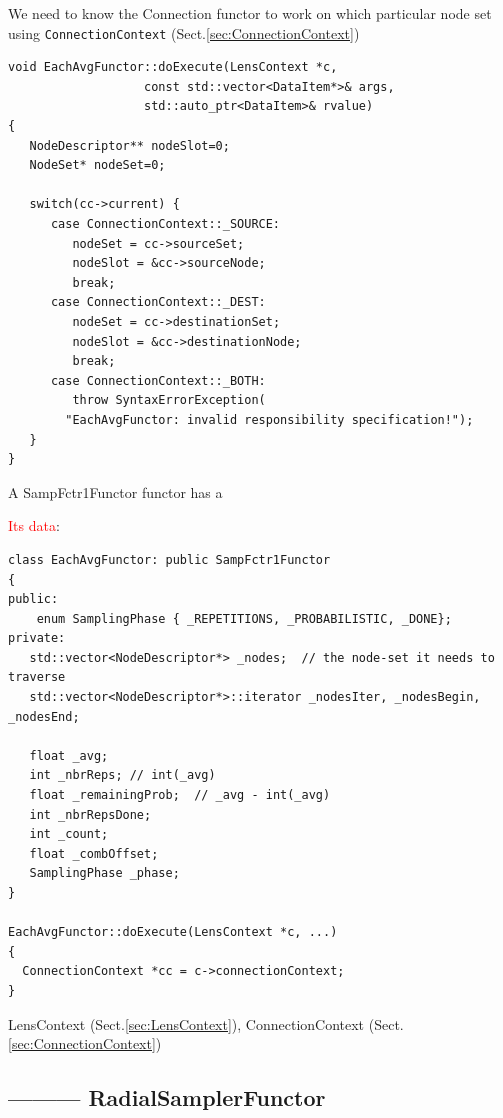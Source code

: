 We need to know the  Connection functor to work on which particular node set
using \verb!ConnectionContext! (Sect.\ref{sec:ConnectionContext})


{\tiny
\begin{lstlisting}
void EachAvgFunctor::doExecute(LensContext *c, 
			       const std::vector<DataItem*>& args, 
			       std::auto_ptr<DataItem>& rvalue)
{
   NodeDescriptor** nodeSlot=0;
   NodeSet* nodeSet=0;

   switch(cc->current) {
      case ConnectionContext::_SOURCE:
         nodeSet = cc->sourceSet;
         nodeSlot = &cc->sourceNode;
         break;
      case ConnectionContext::_DEST:
         nodeSet = cc->destinationSet;
         nodeSlot = &cc->destinationNode;
         break;
      case ConnectionContext::_BOTH:
         throw SyntaxErrorException(
	    "EachAvgFunctor: invalid responsibility specification!");
   }
}
\end{lstlisting}
}

%   
%       
%       


A SampFctr1Functor functor has a 


\textcolor{red}{Its data}:
\begin{verbatim}
class EachAvgFunctor: public SampFctr1Functor
{
public:
    enum SamplingPhase { _REPETITIONS, _PROBABILISTIC, _DONE};
private:
   std::vector<NodeDescriptor*> _nodes;  // the node-set it needs to traverse
   std::vector<NodeDescriptor*>::iterator _nodesIter, _nodesBegin, _nodesEnd;

   float _avg;
   int _nbrReps; // int(_avg)
   float _remainingProb;  // _avg - int(_avg)
   int _nbrRepsDone;
   int _count;
   float _combOffset;
   SamplingPhase _phase;    
}

EachAvgFunctor::doExecute(LensContext *c, ...)
{
  ConnectionContext *cc = c->connectionContext;
}
\end{verbatim}
LensContext (Sect.\ref{sec:LensContext}), ConnectionContext
(Sect.\ref{sec:ConnectionContext})




\subsection{--------- RadialSamplerFunctor}
\label{sec:RadialSamplerFunctor}

